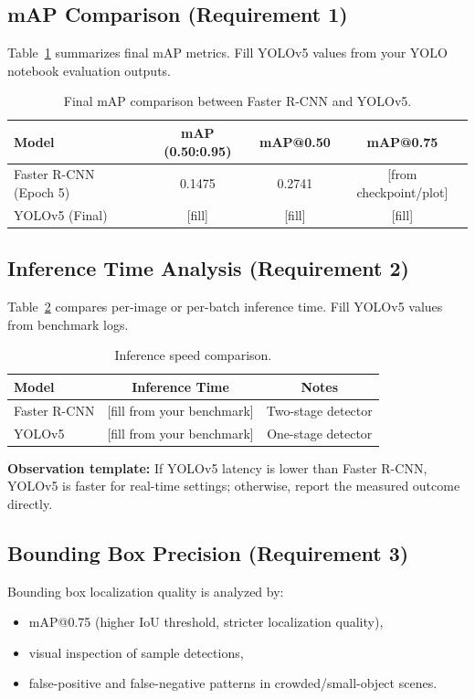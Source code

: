 \documentclass[conference]{IEEEtran}
\begin{document}
\subsection{mAP Comparison (Requirement 1)}
Table~\ref{tab:map-comparison} summarizes final mAP metrics. Fill YOLOv5 values from your YOLO notebook evaluation outputs.

\begin{table}[H]
\centering
\caption{Final mAP comparison between Faster R-CNN and YOLOv5.}
\label{tab:map-comparison}
\begin{tabular}{lccc}
\toprule
\textbf{Model} & \textbf{mAP (0.50:0.95)} & \textbf{mAP@0.50} & \textbf{mAP@0.75} \\
\midrule
Faster R-CNN (Epoch 5) & 0.1475 & 0.2741 & [from checkpoint/plot] \\
YOLOv5 (Final) & [fill] & [fill] & [fill] \\
\bottomrule
\end{tabular}
\end{table}

\subsection{Inference Time Analysis (Requirement 2)}
Table~\ref{tab:speed-comparison} compares per-image or per-batch inference time. Fill YOLOv5 values from benchmark logs.

\begin{table}[H]
\centering
\caption{Inference speed comparison.}
\label{tab:speed-comparison}
\begin{tabular}{lcc}
\toprule
\textbf{Model} & \textbf{Inference Time} & \textbf{Notes} \\
\midrule
Faster R-CNN & [fill from your benchmark] & Two-stage detector \\
YOLOv5 & [fill from your benchmark] & One-stage detector \\
\bottomrule
\end{tabular}
\end{table}

\noindent
\textbf{Observation template:} If YOLOv5 latency is lower than Faster R-CNN, YOLOv5 is faster for real-time settings; otherwise, report the measured outcome directly.

\subsection{Bounding Box Precision (Requirement 3)}
Bounding box localization quality is analyzed by:
\begin{itemize}
    \item mAP@0.75 (higher IoU threshold, stricter localization quality),
    \item visual inspection of sample detections,
    \item false-positive and false-negative patterns in crowded/small-object scenes.
\end{itemize}
\end{document}
